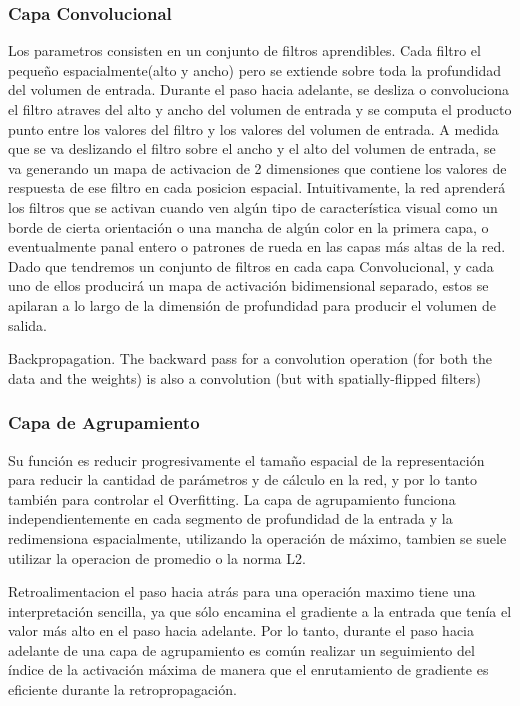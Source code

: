 \documentclass[a4paper,12pt,spanish]{book}
\begin{document}
      \subsubsection{Capa Convolucional} 
	Los parametros consisten en un conjunto de filtros aprendibles. Cada filtro el pequeño espacialmente(alto y ancho) pero se extiende sobre toda la profundidad del volumen de entrada.
	Durante el paso hacia adelante, se desliza o convoluciona el filtro atraves del alto y ancho del volumen de entrada y se computa el producto punto entre los valores del filtro y los valores
	del volumen de entrada. A medida que se va deslizando el filtro sobre el ancho y el alto del volumen de entrada, se va generando un mapa de activacion de 2 dimensiones que contiene los 
	valores de respuesta de ese filtro en cada posicion espacial.
	Intuitivamente, la red aprenderá los filtros que se activan cuando ven algún tipo de característica visual como un borde de cierta orientación o una mancha de algún color en la 
	primera capa, o eventualmente panal entero o patrones de rueda en las capas más altas de la red. Dado que tendremos un conjunto de filtros en cada capa Convolucional, 
	y cada uno de ellos producirá un mapa de activación bidimensional separado, estos se apilaran a lo largo de la dimensión de profundidad para producir el volumen de salida.

	Backpropagation. The backward pass for a convolution operation (for both the data and the weights) is also a convolution (but with spatially-flipped filters)

      \subsubsection{Capa de Agrupamiento} 
	Su función es reducir progresivamente el tamaño espacial de la representación para reducir la cantidad de parámetros y de cálculo en la red, y por lo tanto también para controlar
	el Overfitting. La capa de agrupamiento funciona independientemente en cada segmento de profundidad de la entrada y la redimensiona espacialmente, utilizando la operación de máximo, 
	tambien se suele utilizar la operacion de promedio o la norma L2.

	Retroalimentacion
	el paso hacia atrás para una operación maximo tiene una interpretación sencilla, ya que sólo encamina el gradiente a la entrada que tenía el valor más alto en el paso hacia
	adelante. Por lo tanto, durante el paso hacia adelante de una capa de agrupamiento es común realizar un seguimiento del índice de la activación máxima de manera que 
	el enrutamiento de gradiente es eficiente durante la retropropagación.
\end{document}
